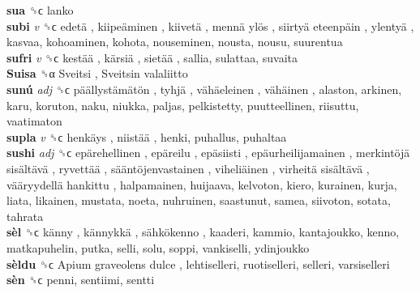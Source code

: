 \textbf{sua} ␝ϲ  lanko  \\
\textbf{subi} \emph{v}  ␝ϲ   edetä ,  kiipeäminen ,  kiivetä ,  mennä ylös ,  siirtyä eteenpäin ,  ylentyä , kasvaa, kohoaminen, kohota, nouseminen, nousta, nousu, suurentua  \\
\textbf{sufri} \emph{v}  ␝ϲ   kestää ,  kärsiä ,  sietää , sallia, sulattaa, suvaita  \\
\textbf{Suisa} ␝α   Sveitsi ,  Sveitsin valaliitto   \\
\textbf{sunú} \emph{adj}  ␝ϲ   päällystämätön ,  tyhjä ,  vähäeleinen ,  vähäinen , alaston, arkinen, karu, koruton, naku, niukka, paljas, pelkistetty, puutteellinen, riisuttu, vaatimaton  \\
\textbf{supla} \emph{v}  ␝ϲ   henkäys ,  niistää , henki, puhallus, puhaltaa  \\
\textbf{sushi} \emph{adj}  ␝ϲ   epärehellinen ,  epäreilu ,  epäsiisti ,  epäurheilijamainen ,  merkintöjä sisältävä ,  ryvettää ,  sääntöjenvastainen ,  viheliäinen ,  virheitä sisältävä ,  vääryydellä hankittu , halpamainen, huijaava, kelvoton, kiero, kurainen, kurja, liata, likainen, mustata, noeta, nuhruinen, saastunut, samea, siivoton, sotata, tahrata  \\
\textbf{sèl} ␝ϲ   känny ,  kännykkä ,  sähkökenno , kaaderi, kammio, kantajoukko, kenno, matkapuhelin, putka, selli, solu, soppi, vankiselli, ydinjoukko  \\
\textbf{sèldu} ␝ϲ   Apium graveolens dulce , lehtiselleri, ruotiselleri, selleri, varsiselleri  \\
\textbf{sèn} ␝ϲ  penni, sentiimi, sentti  \\
